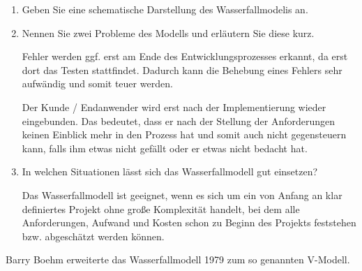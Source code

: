 \documentclass{lehramt-informatik}
\begin{document}
\begin{enumerate}


\item Geben Sie eine schematische Darstellung des Wasserfallmodelis an.

\begin{antwort}
\end{antwort}


\item Nennen Sie zwei Probleme des Modells und erläutern Sie diese kurz.

\begin{antwort}
Fehler werden ggf. erst am Ende des Entwicklungsprozesses erkannt, da
erst dort das Testen stattfindet. Dadurch kann die Behebung eines
Fehlers sehr aufwändig und somit teuer werden.

Der Kunde / Endanwender wird erst nach der Implementierung wieder
eingebunden. Das bedeutet, dass er nach der Stellung der Anforderungen
keinen Einblick mehr in den Prozess hat und somit auch nicht
gegensteuern kann, falls ihm etwas nicht gefällt oder er etwas nicht
bedacht hat.
\end{antwort}


\item In welchen Situationen lässt sich das Wasserfallmodell gut
einsetzen?

\begin{antwort}
Das Wasserfallmodell ist geeignet, wenn es sich um ein von Anfang an
klar definiertes Projekt ohne große Komplexität handelt, bei dem alle
Anforderungen, Aufwand und Kosten schon zu Beginn des Projekts
feststehen bzw. abgeschätzt werden können.
\end{antwort}

\end{enumerate}

\noindent
Barry Boehm erweiterte das Wasserfallmodell 1979 zum so genannten
V-Modell.
\end{document}
